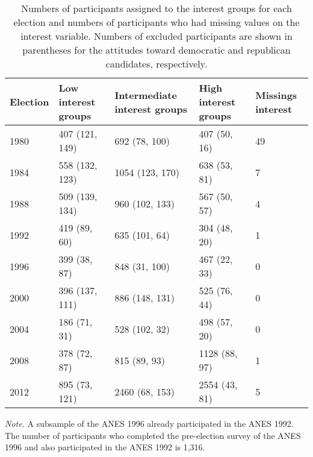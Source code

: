 \documentclass[10pt]{article}
\begin{document}
\begin{table}[h]

 \begin{threeparttable}
    \caption{Numbers of participants assigned to the interest groups for each election and numbers of participants who had missing values on the interest variable. Numbers of excluded participants are shown in parentheses for the attitudes toward democratic and republican candidates, respectively.}
      \label{tab:tab1}
 \begin{tabular}{lllll}
        \toprule
        Election & Low interest groups & Intermediate interest groups & High interest groups & Missings interest \\
        \midrule
                 
        1980 & 407 (121, 149) & 692 (78, 100) & 407 (50, 16) & 49   \\
        1984 & 558 (132, 123) &	1054 (123, 170) &	638 (53, 81) &	7 \\
        1988	& 509 (139, 134) &	960 (102, 133) &	567 (50, 57) &	4\\
	1992	 & 419 (89, 60)	& 635 (101, 64) &	304 (48, 20) &	1\\
        1996	& 399 (38, 87)	& 848 (31, 100)	 & 467 (22, 33) &	0\\
	2000 &	396 (137, 111) &	886 (148, 131) &	525 (76, 44) &	0\\
	2004	 & 186 (71, 31) &	528 (102, 32) & 	498 (57, 20) &	0\\
	2008 &	378 (72, 87) &	815 (89, 93) &	1128 (88, 97) &	1\\
	2012	 & 895 (73, 121) &	2460 (68, 153) &	2554 (43, 81) &	 5\\
        \bottomrule
     \end{tabular}
    \begin{tablenotes}
      \item\textit{Note.} A subsample of the ANES 1996 already participated in the ANES 1992. The number of participants who completed the pre-election survey of the ANES 1996 and also participated in the ANES 1992 is 1,316.
    \end{tablenotes}
  \end{threeparttable}
\end{table}
\end{document}
